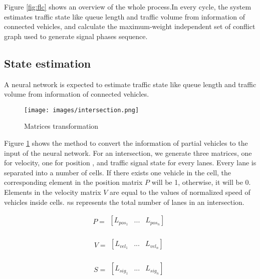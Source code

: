 \documentclass{article}
\begin{document}
Figure \ref{fig:flc} shows an overview of the whole process.In every cycle, the system estimates traffic state like queue length and traffic volume from information of connected vehicles, and calculate the maximum-weight independent set of conflict graph used to generate signal phases sequence.

\subsection{State estimation}

A neural network is expected to estimate traffic state like queue length and traffic volume from information of connected vehicles. 

\begin{figure}[htbp]
    \centering
    \texttt{[image: images/intersection.png]}
    \caption{Matrices transformation}
    \label{fig:mt}
\end{figure}
Figure \ref{fig:mt} shows the method to convert the information of partial vehicles to the input of the neural network. For an intersection, we generate three matrices, one for velocity, one for position , and traffic signal state for every lanes.
Every lane is separated into a number of cells. If there exists one vehicle in the cell, the corresponding element in the position matrix $P$ will be 1, otherwise, it will be 0. Elements in the velocity matrix $V$ are equal to the values of normalized speed of vehicles inside cells. $n$s represents the total number of lanes in an intersection.


\begin{equation*}
  P=\begin{matrix}\left[L_{pos_1}\right.&...&\left.L_{pos_n}\right]\\\end{matrix}  
\end{equation*}

\begin{equation*}
    V=\begin{matrix}\left[L_{vel_1}\right.&...&\left.L_{vel_n}\right]\\\end{matrix}
\end{equation*}

\begin{equation*}
    S=\begin{matrix}\left[L_{sig_1}\right.&...&\left.L_{sig_n}\right]\\\end{matrix}
\end{equation*}
\end{document}

